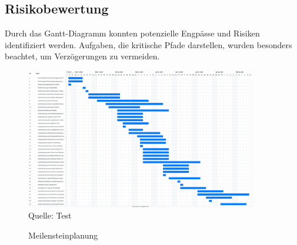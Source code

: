 \subsection{Risikobewertung}
Durch das Gantt-Diagramm konnten potenzielle Engpässe und Risiken identifiziert werden. Aufgaben, die kritische Pfade darstellen, wurden besonders beachtet, um Verzögerungen zu vermeiden.

\begin{figure}[H]
    \caption[Meilensteinplanung]{Meilensteinplanung}
    \includegraphics[width=0.9\textwidth]{assets/figures/STH GANTT Diagramm.png}
    \\
    Quelle: Test
\end{figure}
